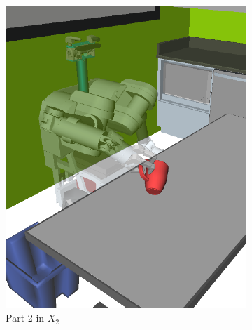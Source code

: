 {\begin{figure}[t]
\begin{widepage}
\begin{center}
\begin{subfigure}[t]{0.19\linewidth}
\includegraphics[width=\columnwidth]{figs/testherb-c.png}
\caption{Part 2 in $X_2$}
\end{subfigure}
\begin{subfigure}[t]{0.19\linewidth}
\centering

\end{subfigure}
\end{center}
\end{widepage}
\end{figure}}
